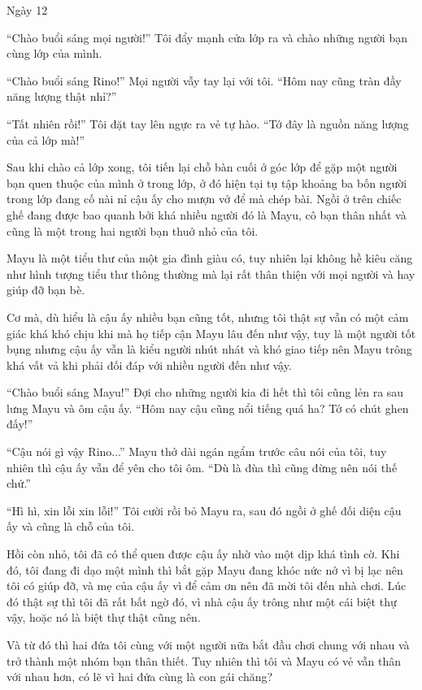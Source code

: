{Ngày 12}
{

    ``Chào buổi sáng mọi người!'' Tôi đẩy mạnh cửa lớp ra và chào những
    người bạn cùng lớp của mình.

    ``Chào buổi sáng Rino!'' Mọi người vẫy tay lại với tôi. ``Hôm nay cũng
    tràn đầy năng lượng thật nhỉ?''

    ``Tất nhiên rồi!'' Tôi đặt tay lên ngực ra vẻ tự hào. ``Tớ đây là nguồn
    năng lượng của cả lớp mà!''

    Sau khi chào cả lớp xong, tôi tiến lại chỗ bàn cuối ở góc lớp để gặp một
    người bạn quen thuộc của mình ở trong lớp, ở đó hiện tại tụ tập khoảng
    ba bốn người trong lớp đang cố nài nỉ cậu ấy cho mượn vở để mà chép bài.
    Ngồi ở trên chiếc ghế đang được bao quanh bởi khá nhiều người đó là
    Mayu, cô bạn thân nhất và cũng là một trong hai người bạn thuở nhỏ của
    tôi.

    Mayu là một tiểu thư của một gia đình giàu có, tuy nhiên lại không hề
    kiêu căng như hình tượng tiểu thư thông thường mà lại rất thân thiện với
    mọi người và hay giúp đỡ bạn bè.

    Cơ mà, dù hiểu là cậu ấy nhiều bạn cũng tốt, nhưng tôi thật sự vẫn có
    một cảm giác khá khó chịu khi mà họ tiếp cận Mayu lâu đến như vậy, tuy
    là một người tốt bụng nhưng cậu ấy vẫn là kiểu người nhút nhát và khó
    giao tiếp nên Mayu trông khá vất vả khi phải đối đáp với nhiều người đến
    như vậy.

    ``Chào buổi sáng Mayu!'' Đợi cho những người kia đi hết thì tôi cũng lẻn
    ra sau lưng Mayu và ôm cậu ấy. ``Hôm nay cậu cũng nổi tiếng quá ha? Tớ
    có chút ghen đấy!''

    ``Cậu nói gì vậy Rino...'' Mayu thở dài ngán ngẩm trước câu nói của tôi,
    tuy nhiên thì cậu ấy vẫn để yên cho tôi ôm. ``Dù là đùa thì cũng đừng
    nên nói thế chứ.''

    ``Hì hì, xin lỗi xin lỗi!'' Tôi cười rồi bỏ Mayu ra, sau đó ngồi ở ghế
    đối diện cậu ấy và cũng là chỗ của tôi.

    Hồi còn nhỏ, tôi đã có thể quen được cậu ấy nhờ vào một dịp khá tình cờ.
    Khi đó, tôi đang đi dạo một mình thì bắt gặp Mayu đang khóc nức nở vì bị
    lạc nên tôi có giúp đỡ, và mẹ của cậu ấy vì để cảm ơn nên đã mời tôi đến
    nhà chơi. Lúc đó thật sự thì tôi đã rất bất ngờ đó, vì nhà cậu ấy trông
    như một cái biệt thự vậy, hoặc nó là biệt thự thật cũng nên.

    Và từ đó thì hai đứa tôi cùng với một người nữa bắt đầu chơi chung với
    nhau và trở thành một nhóm bạn thân thiết. Tuy nhiên thì tôi và Mayu có
    vẻ vẫn thân với nhau hơn, có lẽ vì hai đứa cùng là con gái chăng?

}

